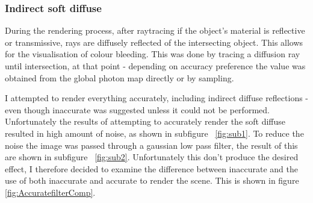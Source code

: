 \documentclass{article}
\begin{document}
\subsubsection{Indirect soft diffuse}
During the rendering process, after raytracing if the object's material is reflective or transmissive, rays are diffusely reflected of the intersecting object. This allows for the visualisation of colour bleeding. This was done by tracing a diffusion ray until intersection, at that point - depending on accuracy preference the value was obtained from the global photon map directly or by sampling.

I attempted to render everything accurately, including indirect diffuse reflections - even though inaccurate was suggested unless it could not be performed. Unfortunately the results of attempting to accurately render the soft diffuse resulted in high amount of noise, as shown in subfigure ~\ref{fig:sub1}. To reduce the noise the image was passed through a gaussian low pass filter, the result of this are shown in subfigure ~\ref{fig:sub2}. Unfortunately this don't produce the desired effect, I therefore decided to examine the difference between inaccurate and the use of both inaccurate and accurate to render the scene. This is shown in figure \ref{fig:AccuratefilterComp}.
\end{document}
